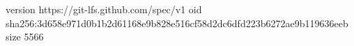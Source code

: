 version https://git-lfs.github.com/spec/v1
oid sha256:3d658e971d0b1b2d61168e9b828e516cf58d2dc6dfd223b6272ae9b119636eeb
size 5566
